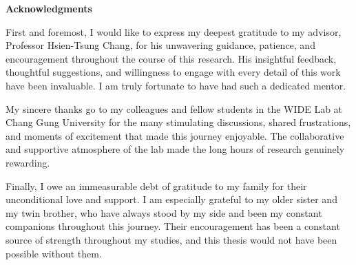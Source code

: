 \clearpage

\begin{center}
\textbf{\large Acknowledgments}
\end{center}

First and foremost, I would like to express my deepest gratitude to my advisor, Professor Hsien-Tsung Chang, for his unwavering guidance, patience, and encouragement throughout the course of this research. His insightful feedback, thoughtful suggestions, and willingness to engage with every detail of this work have been invaluable. I am truly fortunate to have had such a dedicated mentor.

My sincere thanks go to my colleagues and fellow students in the WIDE Lab at Chang Gung University for the many stimulating discussions, shared frustrations, and moments of excitement that made this journey enjoyable. The collaborative and supportive atmosphere of the lab made the long hours of research genuinely rewarding.

Finally, I owe an immeasurable debt of gratitude to my family for their unconditional love and support. I am especially grateful to my older sister and my twin brother, who have always stood by my side and been my constant companions throughout this journey. Their encouragement has been a constant source of strength throughout my studies, and this thesis would not have been possible without them.
